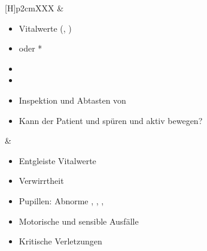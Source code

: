 {\begin{minipage}[t]{\linewidth -
{2\fboxrule} - {2\fboxsep}}
\begin{minipage}[t]{\linewidth}
{\begin{tabularx}{\linewidth}[H]{p{2cm}XXX}
&
\begin{minipage}[t]{\linewidth}
\begin{itemize}
  \item Vitalwerte (, )
  \item {} oder *
  \item {}
  \item {}
  \item[*] Inspektion
  und Abtasten von
  \item[*] Kann der
  Patient  und  spüren und aktiv bewegen?
\end{itemize}
\end{minipage}
&
\noindent\color{darkBlue}\itshape\begin{minipage}[t]{\linewidth}
\begin{itemize}
  \item Entgleiste Vitalwerte
  \item Verwirrtheit
  \item Pupillen: Abnorme , ,
  , 
  \item Motorische und sensible Ausfälle
  \item Kritische Verletzungen
\end{itemize}
\end{minipage}
\\\addlinespace\midrule\addlinespace
\noindent{}



\end{tabularx}}
\end{minipage}
\end{minipage}}
